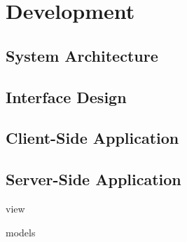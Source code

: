 
\section{Development} %
\label{sec:development}


\subsection{System Architecture} %
\label{sub:system_architecture}



\subsection{Interface Design} %
\label{sub:interface_design}



\subsection{Client-Side Application} %
\label{sub:client_side_application}



\subsection{Server-Side Application} %
\label{sub:server_side_application}

view

models





